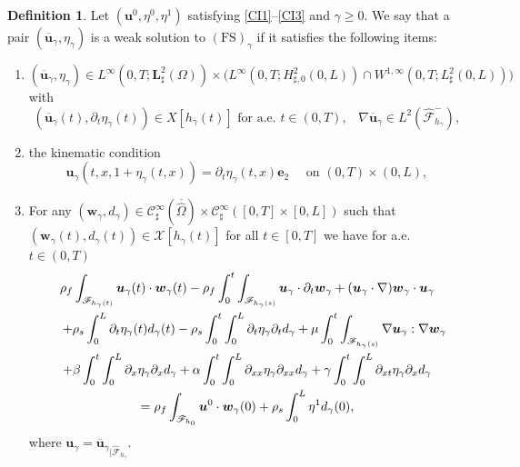 \documentclass[JEP,XML,SOM,Unicode,NoFloatCountersInSection]{cedram}
\let\mathcal\mathscr
\newenvironment{enumeratei}
{\bgroup\def\theenumi{\roman{enumi}}\def\theenumii{\arabic{enumii}}\begin{enumerate}}
{\end{enumerate}\egroup}
\newcommand{\FS}{\mathrm{FS}}
\theoremstyle{remark}
\theoremstyle{definition}
\newtheorem{definition}[theorem]{Definition}
\newcommand{\ug}{\boldsymbol{u}}
\newcommand{\wg}{\boldsymbol{w}}
\newcommand{\BS}[1]{\boldsymbol{#1}}
\let\CM\Omega
\newcommand{\CMT}{\widehat{\Omega}}
\begin{document}
\begin{definition} \label{def.ws}
Let $(\ug^{0},\eta^{0},\eta^{1})$ satisfying \eqref{CI1}--\eqref{CI3} and $\gamma \geq 0$.
We say that a pair $({\overline{\ug}_\gamma},\eta_\gamma)$ is a weak solution to $(\FS)_\gamma$ if it satisfies the following items:
\begin{enumeratei}
\item\label{def.wsi} $({\overline{\ug}_\gamma},\eta_\gamma)\in L^{\infty}(0,T;\BS{L}_{\sharp}^{2}(\CM))\times \bigl(L^{\infty}(0,T;H^{2}_{\sharp, 0}(0,L))\cap W^{1,\infty}(0,T;L_\sharp^{2}(0,L))\bigr)$ with\vspace*{-3pt}
\[
({\overline{\ug}_\gamma}(t), \partial_t\eta_\gamma(t))\in X[h_\gamma(t)] \text{ for a.e. $t\in(0,T)$,} \quad
\nabla \overline{\ug}_\gamma \in L^{2}(\hat{\mathcal{F}}^{-}_{h_\gamma}),
\]
\item\label{def.wsii} the kinematic condition
\[
\ug_\gamma(t, x, 1+\eta_\gamma(t, x))=\partial_t\eta_\gamma(t,x) \BS{e}_2 \quad \textrm{ on } (0, T) \times (0, L),
\]
\item\label{def.wsiii}
For any $(\wg_\gamma, d_\gamma)\in \mathcal{C}_\sharp^{\infty}\left(\overline{\CMT}\right)\times\mathcal{C}_\sharp^{\infty}( [0, T]\times[0, L] )$ such that $(\wg_\gamma(t), d_\gamma(t))\in\mathcal{X}[h_\gamma(t)]$ for all $t\in [0,T]$ we have for a.e. $t\in(0,T)$
\begin{multline}\label{weak.formulation.FS}
\rho_{f}\int_{\mathcal{F}_{h_\gamma(t)}}\ug_\gamma(t)\cdot\wg_\gamma(t) -\rho_{f}\int_{0}^{t}\int_{\mathcal{F}_{h_\gamma(s)}}\ug_\gamma\cdot\partial_{t}\wg_\gamma + (\ug_\gamma\cdot\nabla)\wg_\gamma\cdot\ug_\gamma\\
\hspace*{4mm}+\rho_{s}\int_{0}^{L}\partial_{t}\eta_\gamma(t)d_\gamma(t)-\rho_{s}\int_{0}^{t}\int_{0}^{L}\partial_{t}\eta_\gamma\partial_{t}d_\gamma+\mu\int_{0}^{t}\int_{\mathcal{F}_{h_\gamma(s)}} \nabla\ug_\gamma:\nabla\wg_\gamma\\
+\beta\int_{0}^{t}\int_{0}^{L}\partial_{x}\eta_\gamma\partial_{x}d_\gamma + \alpha\int_{0}^{t}\int_{0}^{L}\partial_{xx}\eta_\gamma\partial_{xx}d_\gamma+\gamma\int_{0}^{t}\int_{0}^{L}\partial_{xt}\eta_\gamma\partial_{x}d_\gamma \\
=\rho_{f}\int_{\mathcal{F}_{h_0}}\ug^{0}\cdot\wg_\gamma(0)+\rho_{s}\int_{0}^{L}\eta^{1}d_\gamma(0),
\end{multline}
where $\ug_\gamma={\overline{\ug}_\gamma}_{\vert \widehat{\mathcal{F}}_{h_\gamma}}$.
\end{enumeratei}
\end{definition}
\end{document}
